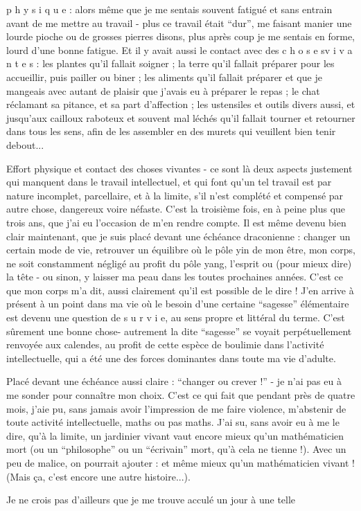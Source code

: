 

p h y s i q u e : alors même que je me sentais souvent fatigué et sans entrain avant de me mettre au travail - plus ce travail était ``dur'', me faisant manier une lourde pioche ou de grosses pierres disons, plus après coup je me sentais en forme, lourd d'une bonne fatigue. Et il y avait aussi le contact avec des c h o s e s\quad v i v a n t e s : les plantes qu'il fallait soigner ; la terre qu'il fallait préparer pour les accueillir, puis pailler ou biner ; les aliments qu'il fallait préparer et que je mangeais avec autant de plaisir que j'avais eu à préparer le repas ; le chat réclamant sa pitance, et sa part d'affection ; les ustensiles et outils divers aussi, et jusqu'aux cailloux raboteux et souvent mal léchés qu'il fallait tourner et retourner dans tous les sens, afin de les assembler en des murets qui veuillent bien tenir debout...

Effort physique et contact des choses vivantes - ce sont là deux aspects justement qui manquent dans le travail intellectuel, et qui font qu'un tel travail est par nature incomplet, parcellaire, et à la limite, s'il n'est complété et compensé par autre chose, dangereux voire néfaste. C'est la troisième fois, en à peine plus que trois ans, que j'ai eu l'occasion de m'en rendre compte. Il est même devenu bien clair maintenant, que je suis placé devant une échéance draconienne : changer un certain mode de vie, retrouver un équilibre où le pôle yin de mon être, mon corps, ne soit constamment négligé au profit du pôle yang, l'esprit ou (pour mieux dire) la tête - ou sinon, y laisser ma peau dans les toutes prochaines années. C'est ce que mon corps m'a dit, aussi clairement qu'il est possible de le dire ! J'en arrive à présent à un point dans ma vie où le besoin d'une certaine ``sagesse'' élémentaire est devenu une question de s u r v i e, au sens propre et littéral du terme. C'est sûrement une bonne chose- autrement la dite ``sagesse'' se voyait perpétuellement renvoyée aux calendes, au profit de cette espèce de boulimie dans l'activité intellectuelle, qui a été une des forces dominantes dans toute ma vie d'adulte.

Placé devant une échéance aussi claire : ``changer ou crever !'' - je n'ai pas eu à me sonder pour connaître mon choix. C'est ce qui fait que pendant près de quatre mois, j'aie pu, sans jamais avoir l'impression de me faire violence, m'abstenir de toute activité intellectuelle, maths ou pas maths. J'ai su, sans avoir eu à me le dire, qu'à la limite, un jardinier vivant vaut encore mieux qu'un mathématicien mort (ou un ``philosophe'' ou un ``écrivain'' mort, qu'à cela ne tienne !). Avec un peu de malice, on pourrait ajouter : et même mieux qu'un mathématicien vivant ! (Mais ça, c'est encore une autre histoire...).

Je ne crois pas d'ailleurs que je me trouve acculé un jour à une telle


